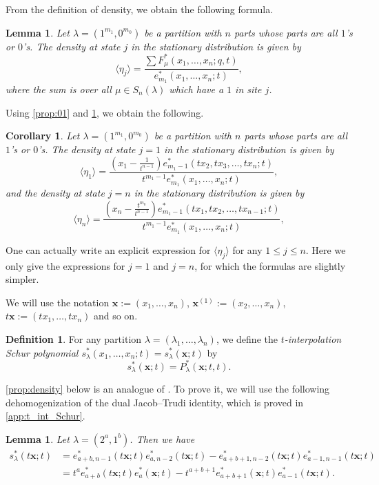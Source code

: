 \documentclass[12pt]{amsart}
\newtheorem{cor}[thm]{Corollary}
\newtheorem{lem}[thm]{Lemma}
\theoremstyle{definition}
\newtheorem{definition}[thm]{Definition}
\newcommand{\bfx}{\boldsymbol{x}}
\begin{document}
From the definition of density, we obtain the following formula. 
\begin{lem}\label{lem:density}
Let $\lambda = (1^{m_1}, 0^{m_0})$ be a partition with $n$ parts whose parts are all $1$'s or $0$'s.
  The density at state $j$ in the stationary distribution is given by 
  $$\langle \eta_j \rangle =
  \frac{\sum F^*_{\mu}(x_1,\dots,x_n; q,t)}{e^*_{m_1}(x_1,\dots,x_n;t)},$$
  where the sum is over all $\mu\in S_n(\lambda)$ which have a $1$ in site $j$.
\end{lem}
Using \cref{prop:01} and \cref{lem:density}, we obtain the following.
\begin{cor}\label{cor:density}
    Let $\lambda = (1^{m_1}, 0^{m_0})$ be a partition with $n$ parts whose parts are all $1$'s or $0$'s.
  The density at state $j=1$ in the stationary distribution is given by 
  \begin{equation}\label{eq:density}
  \langle \eta_1 \rangle =
  \frac{(x_1-\frac{1}{t^{n-1}}) e^*_{m_1-1}(tx_2, tx_3,\dots,tx_n;t)} {t^{m_1-1} e^*_{m_1}(x_1,\dots,x_n;t)},
  \end{equation}
   and the density at state $j=n$ in the stationary distribution is given by 
  $$\langle \eta_n \rangle =
  \frac{(x_n-\frac{t^{m_0}}{t^{n-1}}) e^*_{m_1-1}(tx_1, tx_2, \dots,tx_{n-1};t)} {t^{m_1-1} e^*_{m_1}(x_1,\dots,x_n;t)},$$
\end{cor}
One can actually write an explicit expression for $\langle\eta_j\rangle$ for any $1\leq j\leq n$. Here we only give the expressions for $j=1$ and $j=n$, for which the formulas are slightly simpler.


We will use the notation $\bfx:=(x_1,\dots,x_n)$, $\bfx^{(1)}:=(x_2,\dots,x_n)$,  $t\bfx:=(tx_1,\dots,tx_n)$ and so on.
\begin{definition}\label{def:sstar}
For any partition $\lambda=(\lambda_1,\dots,\lambda_n)$, we define the \emph{$t$-interpolation Schur polynomial $s_\lambda^*(x_1,\dots,x_n;t)=s^*_\lambda(\bfx;t)$} by
    $$s^*_\lambda(\bfx;t)=P^*_\lambda(\bfx;t,t).$$
\end{definition}


\cref{prop:density} below is an analogue of \cite[Corollary 7.1]{AyyerMartinWilliams2025}.  To prove it, we will use the following dehomogenization of the dual Jacob–Trudi identity, which is proved in \cref{app:t_int_Schur}.
\begin{lem}\label{lem:2column}
Let $\lambda=(2^a,1^b)$.  Then we have 
\begin{align*}
s^*_{\lambda}(t\bfx;t)&=e^*_{a+b,n-1}(t\bfx;t)e^*_{a,n-2}(t\bfx;t)-e^*_{a+b+1,n-2}(t\bfx;t)e^*_{a-1,n-1}(t\bfx;t)\\
&=t^a e^*_{a+b}(t\bfx;t) e^*_a(\bfx;t) - t^{a+b+1} e^*_{a+b+1}(\bfx;t) e^*_{a-1}(t\bfx;t).
\end{align*}
\end{lem}
\end{document}
